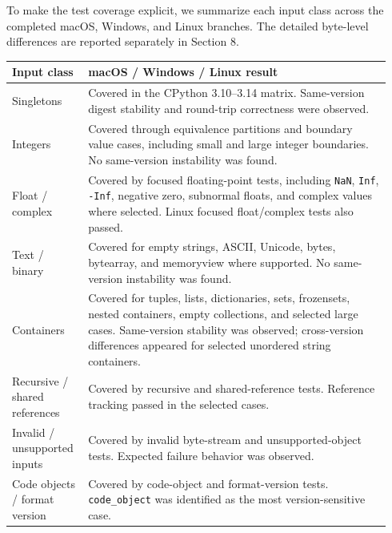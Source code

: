 \documentclass[10pt,a4paper]{article}
\begin{document}
To make the test coverage explicit, we summarize each input class across the completed macOS, Windows, and Linux branches. The detailed byte-level differences are reported separately in Section 8.

\begingroup
\small
\setlength{\tabcolsep}{5pt}
\renewcommand{\arraystretch}{1.10}

\begin{longtable}{@{}L{0.18\linewidth}L{0.76\linewidth}@{}}
\toprule
\textbf{Input class} & \textbf{macOS / Windows / Linux result} \\
\midrule

Singletons &
Covered in the CPython 3.10--3.14 matrix. Same-version digest stability and round-trip correctness were observed. \\

Integers &
Covered through equivalence partitions and boundary value cases, including small and large integer boundaries. No same-version instability was found. \\

Float / complex &
Covered by focused floating-point tests, including \texttt{NaN}, \texttt{Inf}, \texttt{-Inf}, negative zero, subnormal floats, and complex values where selected. Linux focused float/complex tests also passed. \\

Text / binary &
Covered for empty strings, ASCII, Unicode, bytes, bytearray, and memoryview where supported. No same-version instability was found. \\

Containers &
Covered for tuples, lists, dictionaries, sets, frozensets, nested containers, empty collections, and selected large cases. Same-version stability was observed; cross-version differences appeared for selected unordered string containers. \\

Recursive / shared references &
Covered by recursive and shared-reference tests. Reference tracking passed in the selected cases. \\

Invalid / unsupported inputs &
Covered by invalid byte-stream and unsupported-object tests. Expected failure behavior was observed. \\

Code objects / format version &
Covered by code-object and format-version tests. \texttt{code\_object} was identified as the most version-sensitive case. \\

\bottomrule
\end{longtable}
\endgroup
\end{document}
